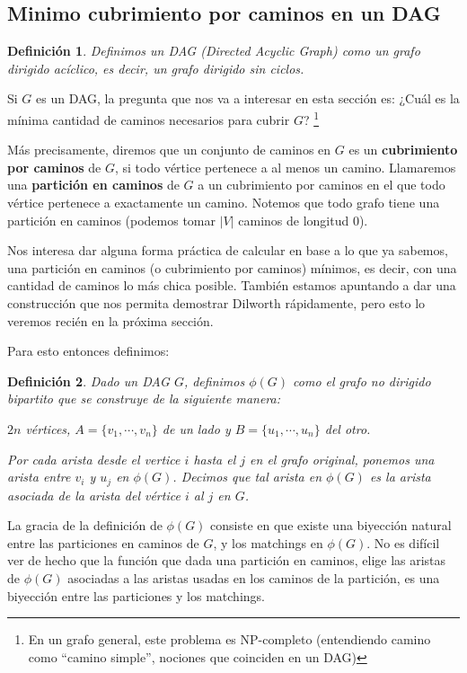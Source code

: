 \documentclass{article}
\newtheorem{definicion}{{\sc Definición}}
\begin{document}
\subsection{Minimo cubrimiento por caminos en un DAG}

\begin{definicion}
Definimos un DAG (Directed Acyclic Graph) como un grafo dirigido acíclico, es decir, un grafo dirigido sin ciclos.
\end{definicion}

Si $G$ es un DAG, la pregunta que nos va a interesar en esta sección es: ¿Cuál es la mínima cantidad de caminos necesarios para cubrir $G$?
\footnote{En un grafo general, este problema es NP-completo (entendiendo camino como ``camino simple'', nociones que coinciden en un DAG)}

Más precisamente, diremos que un conjunto de caminos en $G$ es un \textbf{cubrimiento por caminos} de $G$, si todo vértice pertenece a
al menos un camino. Llamaremos una \textbf{partición en caminos} de $G$ a un cubrimiento por caminos en el que todo vértice pertenece a
exactamente un camino. Notemos que todo grafo tiene una partición en caminos (podemos tomar $|V|$ caminos de longitud 0).

Nos interesa dar alguna forma práctica de calcular en base a lo que ya sabemos, una partición en caminos (o cubrimiento por caminos) mínimos,
es decir, con una cantidad de caminos lo más chica posible. También estamos apuntando a dar una construcción que
nos permita demostrar Dilworth rápidamente, pero esto lo veremos recién en la próxima sección.

Para esto entonces definimos:

\begin{definicion}
Dado un DAG $G$, definimos $\phi(G)$ como el grafo no dirigido bipartito que se construye de la siguiente manera:

$2n$ vértices, $A = \{v_1, \cdots, v_n \}$ de un lado y $B = \{ u_1, \cdots, u_n \}$ del otro.

Por cada arista desde el vertice $i$ hasta el $j$ en el grafo original, ponemos una arista entre $v_i$ y $u_j$ en $\phi(G)$. Decimos que
tal arista en $\phi(G)$ es la arista asociada de la arista del vértice $i$ al $j$ en $G$.

\end{definicion}

La gracia de la definición de $\phi(G)$ consiste en que existe una biyección natural entre las particiones en caminos de $G$, y los
matchings en $\phi(G)$. No es difícil ver de hecho que la función que dada una partición en caminos, elige las aristas de $\phi(G)$
asociadas a las aristas usadas en los caminos de la partición, es una biyección entre las particiones y los matchings.
\end{document}
